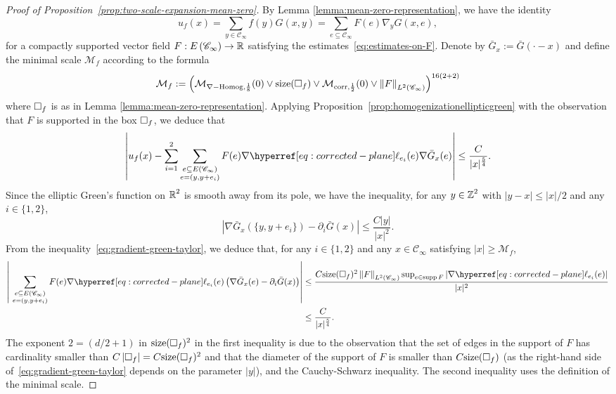 \documentclass[12pt]{amsart}
\numberwithin{equation}{section}
\begin{document}
	\begin{proof}[Proof of Proposition~\ref{prop:two-scale-expansion-mean-zero}]
		By Lemma \ref{lemma:mean-zero-representation}, we have the identity 
		\begin{equation*}
			u_f (x) = \sum_{y \in \mathscr{C}_\infty} f(y) G(x , y)  = \sum_{e \subseteq \mathscr{C}_\infty} F(e) \nabla_y G(x, e),
		\end{equation*}
		for a compactly supported vector field $F : E \left( \mathscr{C}_\infty \right) \to \operatorname{\mathbb{R}}$ satisfying the estimates~\eqref{eq:estimates-on-F}. Denote by $\bar G_x := \bar G(\cdot - x)$ and define the minimal scale $\mathcal{M}_f$ according to the formula
		\begin{equation*}
			\mathcal{M}_f := \left( \mathcal{M}_{\nabla-\mathrm{Homog}, \frac{1}{8}}(0) \vee \mathrm{size}(\square_f) \vee \mathcal{M}_{\mathrm{corr}, \frac12}(0) \vee  \left\| F \right\|_{L^2 ( \mathscr{C}_\infty)}\right)^{16(2+2)}
		\end{equation*}
		where $\square_f$ is as in Lemma \ref{lemma:mean-zero-representation}. Applying Proposition~\ref{prop:homogenizationellipticgreen} with the observation that $F$ is supported in the box $\square_f$, we deduce that
		\begin{equation*}
			\left| u_f(x) - \sum_{i = 1}^2 \sum_{\substack{e \subseteq E(\mathscr{C}_\infty) \\ e = (y , y+e_i)}} F(e) \nabla \ellp{e_i}(e) \nabla \bar G_x(e) \right| \leq \frac{C}{|x|^{\frac 54}}.
		\end{equation*}Since the elliptic Green's function on $\operatorname{\mathbb{R}}^2$ is smooth away from its pole, we have the inequality, for any $y \in \operatorname{\mathbb{Z}}^2$ with $|y - x| \leq |x|/2$ and any $i \in \{ 1 , 2\}$,
		\begin{equation} \label{eq:gradient-green-taylor}
			\left| \nabla \bar G_x (\{y , y+e_i\}) - \partial_i \bar G(x)  \right| \leq \frac{C \left|y\right|}{|x|^2}.
		\end{equation}
		From the inequality~\eqref{eq:gradient-green-taylor}, we deduce that, for any $i \in \{1, 2\}$ and any $x \in \mathscr{C}_\infty$ satisfying $|x| \geq \mathcal{M}_f$,
		\begin{align*}
			\left| \sum_{\substack{e \subseteq E(\mathscr{C}_\infty) \\ e = (y , y+e_i)}} F(e) \nabla \ellp{e_i}(e) \left( \nabla \bar G_x(e) - \partial_i \bar G(x) \right) \right| & \leq \frac{C \size(\cu_f)^{2} \left\| F \right\|_{L^2 ( \mathscr{C}_\infty)} \sup_{e \in \supp F} \left| \nabla \ellp{e_i}(e) \right|}{|x|^2} \\
			& \leq \frac{C}{|x|^{\frac{5}{4}}}.
		\end{align*}
		The exponent $2 = (d/2+1)$ in $\mathrm{size}(\square_f)^{2}$ in the first inequality is due to the observation that the set of edges in the support of $F$ has cardinality smaller than $C \left| \square_f\right| = C  \mathrm{size}(\square_f)^2$ and that the diameter of the support of $F$ is smaller than $C \mathrm{size}(\square_f)$ (as the right-hand side of~\eqref{eq:gradient-green-taylor} depends on the parameter $|y|$), and the Cauchy-Schwarz inequality. The second inequality uses the definition of the minimal scale. 
		

\end{proof}
\end{document}
